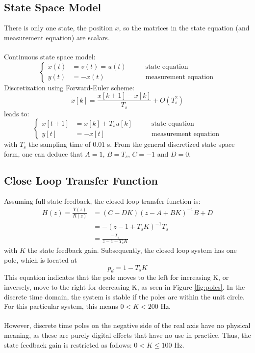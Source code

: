 \documentclass[a4paper,kul]{kulakarticle} %
\begin{document}
\subsection{State Space Model}
There is only one state, the position $x$, so the matrices in the state equation (and measurement equation) are scalars. 
\\\\
Continuous state space model:
\begin{equation}
\left\{
	\begin{split}
	\dot{x}(t) &= v(t) = u(t) \qquad &\text{state equation} \\
	y(t) &= -x(t) &\text{measurement equation}
	\end{split}
	\right.
\end{equation}
Discretization using Forward-Euler scheme:
\begin{equation}
	\dot{x}[k] = \frac{x[k+1] - x[k]}{T_s} + O(T_s^2)
\end{equation}
leads to:
\begin{equation}
\left\{
\begin{split}
\dot{x}[t+1] &= x[k] + T_s u[k] \qquad &\text{state equation} \\
y[t] &= -x[t] &\text{measurement equation}
\end{split}
\right.
\end{equation}
with $T_s$ the sampling time of $0.01$ s. From the general discretized state space form, one can deduce that $A = 1$, $B = T_s$, $C = -1$ and $D = 0$.

\subsection{Close Loop Transfer Function}
\label{subsec:tf}
Assuming full state feedback, the closed loop transfer function is:
\begin{equation}
	\begin{split}
	H(z) = \frac{Y(z)}{R(z)} &= (C-DK)(z - A + BK)^{-1}B + D \\
	&= -(z-1 + T_s K)^{-1} T_s \\
	&= \frac{-T_s}{z-1+T_sK}
	\end{split}
\end{equation}
with $K$ the state feedback gain. Subsequently, the closed loop system has one pole, which is located at
\begin{equation}
	p_d = 1 - T_s K
\end{equation}
This equation indicates that the pole moves to the left for increasing K, or inversely, move to the right for decreasing K, as seen in Figure \ref{fig:poles}. In the discrete time domain, the system is stable if the poles are within the unit circle. For this particular system, this means $0 < K < 200$ Hz. 
\\\\
However, discrete time poles on the negative side of the real axis have no physical meaning, as these are purely digital effects that have no use in practice. Thus, the state feedback gain is restricted as follows: $0 < K \le 100$ Hz.
\end{document}
